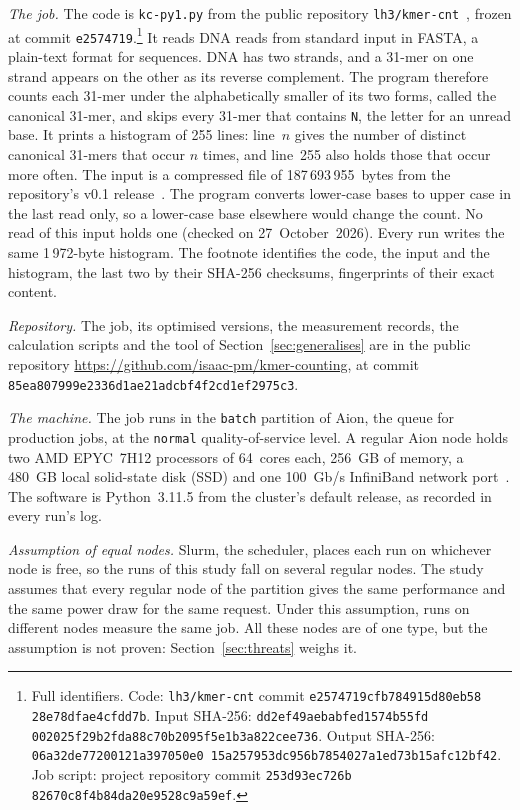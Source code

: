 \documentclass[conference,a4paper]{IEEEtran}
\newcommand{\repourl}{\url{https://github.com/isaac-pm/kmer-counting}}
\newcommand{\repocommit}{85ea807999e2\allowbreak 336d1ae21adc\allowbreak bf4f2cd1ef29\allowbreak 75c3}
\begin{document}
\emph{The job.} The code is \texttt{kc-py1.py} from the public repository
\texttt{lh3/kmer-cnt}~\cite{kmercnt}, frozen at commit
\texttt{e2574719}.\footnote{Full identifiers. Code: \texttt{lh3/kmer-cnt}
commit \texttt{e2574719cfb7\allowbreak 84915d80eb58\allowbreak
28e78dfae4cf\allowbreak dd7b}. Input SHA-256:
\texttt{dd2ef49aebab\allowbreak fed1574b55fd\allowbreak
002025f29b2f\allowbreak da88c70b2095\allowbreak f5e1b3a822ce\allowbreak e736}.
Output SHA-256: \texttt{06a32de77200\allowbreak 121a397050e0\allowbreak
15a257953dc9\allowbreak 56b7854027a1\allowbreak ed73b15afc12\allowbreak bf42}.
Job script: project repository commit \texttt{253d93ec726b\allowbreak
82670c8f4b84\allowbreak da20e9528c9a\allowbreak 59ef}.}
It reads DNA reads from standard input in FASTA, a plain-text format for
sequences. DNA has two strands, and a 31-mer on one strand appears on the other
as its reverse complement. The program therefore counts each 31-mer under the
alphabetically smaller of its two forms, called the canonical 31-mer, and skips
every 31-mer that contains \texttt{N}, the letter for an unread base. It prints
a histogram of 255 lines: line~$n$ gives the number of distinct canonical
31-mers that occur $n$ times, and line~255 also holds those that occur more
often. The input is a compressed file of 187\,693\,955~bytes from the
repository's v0.1 release~\cite{kmercnt}. The program converts lower-case bases
to upper case in the last read only, so a lower-case base elsewhere would change
the count. No read of this input holds one (checked on 27~October~2026). Every
run writes the same 1\,972-byte histogram. The footnote identifies the code,
the input and the histogram, the last two by their SHA-256 checksums,
fingerprints of their exact content.

\emph{Repository.} The job, its optimised versions, the measurement records,
the calculation scripts and the tool of Section~\ref{sec:generalises} are in
the public repository \repourl, at commit \texttt{\repocommit}.

\emph{The machine.} The job runs in the \texttt{batch} partition of Aion, the
queue for production jobs, at the \texttt{normal} quality-of-service level. A
regular Aion node holds two AMD EPYC~7H12 processors of 64~cores each, 256~GB of
memory, a 480~GB local solid-state disk (SSD) and one 100~Gb/s InfiniBand
network port~\cite{ulhpcaion}. The software is Python~3.11.5 from the cluster's
default release, as recorded in every run's log.

\emph{Assumption of equal nodes.} Slurm, the scheduler, places each run on
whichever node is free, so the runs of this study fall on several regular
nodes. The study assumes that every regular node of the partition gives the same
performance and the same power draw for the same request. Under this
assumption, runs on different nodes measure the same job. All these nodes are of
one type, but the assumption is not proven: Section~\ref{sec:threats} weighs
it.
\end{document}
